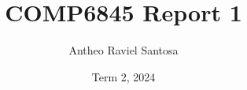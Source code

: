 \documentclass[a4paper]{article}
\begin{document}
\title{COMP6845 Report 1}
\author{Antheo Raviel Santosa}
\date{Term 2, 2024}
\maketitle



\tableofcontents %
% 
% 

% 

% 
% 
\end{document}
